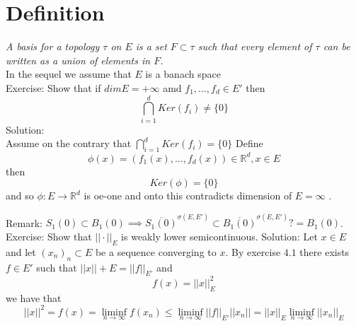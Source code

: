 \documentclass[11pt]{article}
\begin{document}
\section{Definition}
\emph{
    A basis for a topology $\tau$ on  $E$ is a set  $F \subset \tau$ such that
    every element of $\tau$ can be written as a union of elements in  $F$.
}\\
In the sequel we assume that $E$ is a banach space\\
Exercise: Show that if $dim E = +\infty$  amd $f_1, \dots ,f_d \in E'$ then
\[
    \bigcap_{i=1}^{d} Ker(f_i) \ne \{0\}
\] 
Solution:\\
Assume on the contrary that $\bigcap_{i=1}^{d} Ker(f_i) = \{0\}$ Define
\[
\phi(x) = (f_1(x), \dots, f_d(x)) \in \mathbb{R}^{d}, x \in E
\] 
then
\[
    Ker(\phi) = \{0\}
\] 
and so $\phi : E \rightarrow \mathbb{R}^{d}$ is oe-one and onto this contradicts dimension of $E = \infty$ .

Remark: $S_1(0) \subset B_1(0) \implies \overline{S_1(0)}^{\sigma(E,E')} \subset \overline{B_1(0)}^{\sigma(E,E')} ?= B_1(0)$.
Exercise:
Show that $||\cdot||_E$ is weakly lower semicontinuous.
Solution: Let  $x \in E$ and let  $(x_n)_n \subset E$ be a sequence converging to $x$. By exercise  $4.1$ there
exists  $f \in E'$ such that  $||x||+E = ||f||_{E'}$ and
 \[
f(x) = ||x||^2_E
\] 
we have that
\[
||x||^2 = f(x) = \liminf_{n\to \infty} f(x_n) \le \liminf_{n\to \infty} ||f||_{E'} ||x_n|| = ||x||_E \liminf_{n\to \infty} ||x_n||_E
\] 
\end{document}
